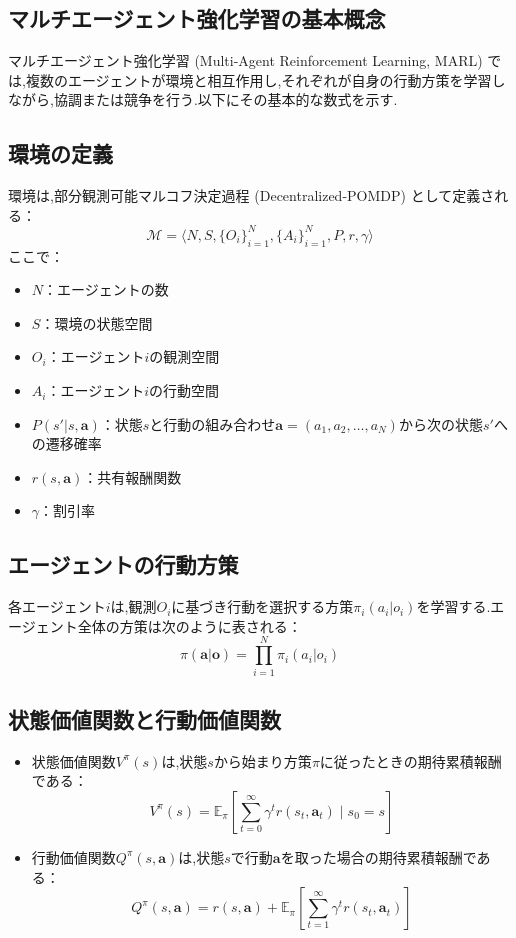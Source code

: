 \subsection{マルチエージェント強化学習の基本概念}

マルチエージェント強化学習 (Multi-Agent Reinforcement Learning, MARL) では,複数のエージェントが環境と相互作用し,それぞれが自身の行動方策を学習しながら,協調または競争を行う.以下にその基本的な数式を示す.

\subsection*{環境の定義}
環境は,部分観測可能マルコフ決定過程 (Decentralized-POMDP) として定義される：
\[
\mathcal{M} = \langle N, S, \{O_i\}_{i=1}^N, \{A_i\}_{i=1}^N, P, r, \gamma \rangle
\]
ここで：
\begin{itemize}
    \item $N$：エージェントの数
    \item $S$：環境の状態空間
    \item $O_i$：エージェント$i$の観測空間
    \item $A_i$：エージェント$i$の行動空間
    \item $P(s' | s, \boldsymbol{a})$：状態$s$と行動の組み合わせ$\boldsymbol{a} = (a_1, a_2, \dots, a_N)$から次の状態$s'$への遷移確率
    \item $r(s, \boldsymbol{a})$：共有報酬関数
    \item $\gamma$：割引率
\end{itemize}

\subsection*{エージェントの行動方策}
各エージェント$i$は,観測$O_i$に基づき行動を選択する方策$\pi_i(a_i | o_i)$を学習する.エージェント全体の方策は次のように表される：
\[
\pi(\boldsymbol{a} | \boldsymbol{o}) = \prod_{i=1}^N \pi_i(a_i | o_i)
\]

\subsection*{状態価値関数と行動価値関数}
\begin{itemize}
    \item 状態価値関数$V^\pi(s)$は,状態$s$から始まり方策$\pi$に従ったときの期待累積報酬である：
    \[
    V^\pi(s) = \mathbb{E}_\pi \left[ \sum_{t=0}^\infty \gamma^t r(s_t, \boldsymbol{a}_t) \mid s_0 = s \right]
    \]
    \item 行動価値関数$Q^\pi(s, \boldsymbol{a})$は,状態$s$で行動$\boldsymbol{a}$を取った場合の期待累積報酬である：
    \[
    Q^\pi(s, \boldsymbol{a}) = r(s, \boldsymbol{a}) + \mathbb{E}_\pi \left[ \sum_{t=1}^\infty \gamma^t r(s_t, \boldsymbol{a}_t) \right]
    \]
\end{itemize}

